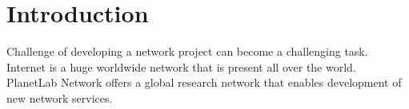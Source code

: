 \chapter*{Introduction}
{}

Challenge of developing a network project can become a challenging task. Internet is a huge worldwide network that is present all over the world. PlanetLab Network offers a global research network that enables development of new network services. 